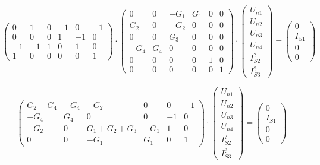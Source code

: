 \documentclass[a4paper]{article}
\begin{document}
{\begin{equation*}
   \begin{pmatrix}
      0 & 1 & 0 & -1 & 0 & -1 \\
      0 & 0 & 0 & 1 & -1 & 0  \\
      -1 & -1 & 1 & 0 & 1 & 0 \\
      1 & 0 & 0 & 0 & 0 & 1  
   \end{pmatrix}
   \cdot
   \begin{pmatrix}
      0 & 0 & -G_1 & G_1 & 0 & 0 \\
      G_2 & 0 & -G_2 & 0 & 0 & 0 \\
      0 & 0 & G_3 & 0 & 0 & 0 \\
      -G_4 & G_4 & 0 & 0 & 0 & 0\\
      0 & 0 & 0 & 0 & 1 & 0 \\
      0 & 0 & 0 & 0 & 0 & 1 
   \end{pmatrix}
   \cdot
   \begin{pmatrix}
      U_{n1} \\ U_{n2} \\ U_{n3} \\ U_{n4} \\ I_{S2}^? \\ I_{S3}^?
   \end{pmatrix}
   =
   \begin{pmatrix}
      0 \\ I_{S1} \\ 0 \\ 0  
   \end{pmatrix}
\end{equation*}

\hspace{2cm}

\begin{equation}
\begin{pmatrix}
   G_2 + G_4 & -G_4 & -G_2 & 0 & 0 & -1 \\
   -G_4 & G_4 & 0 & 0 & -1 & 0 \\
   -G_2 & 0 & G_1+G_2+G_3 & -G_1 & 1 & 0 \\
   0 & 0 & -G_1 & G_1 & 0 & 1 
\end{pmatrix}
\cdot
\begin{pmatrix}
   U_{n1} \\ U_{n2} \\ U_{n3} \\ U_{n4} \\ I_{S2}^? \\ I_{S3}^?
\end{pmatrix}
=
\begin{pmatrix}
   0 \\ I_{S1} \\ 0 \\ 0  
\end{pmatrix}
\label{eqn:nodes_currents}
\end{equation}

}
\end{document}
